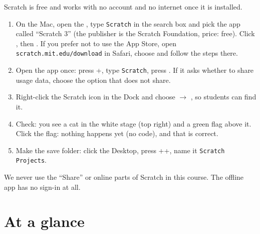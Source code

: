 \begin{teachernote}
Scratch is free and works with no account and no internet once it is installed.
\begin{enumerate}[leftmargin=1.4em,itemsep=1pt]
  \item On the Mac, open the , type \texttt{Scratch} in the search box and pick the app called \enquote{Scratch 3} (the publisher is the Scratch Foundation, price: free). Click , then . If you prefer not to use the App Store, open \texttt{scratch.mit.edu/download} in Safari, choose  and follow the steps there.
  \item Open the app once: press +, type \texttt{Scratch}, press . If it asks whether to share usage data, choose the option that does not share.
  \item Right-click the Scratch icon in the Dock and choose  $\rightarrow$ , so students can find it.
  \item Check: you see a cat in the white stage (top right) and a green flag above it. Click the flag: nothing happens yet (no code), and that is correct.
  \item Make the save folder: click the Desktop, press ++, name it \texttt{Scratch Projects}.
\end{enumerate}
We never use the \enquote{Share} or online parts of Scratch in this course. The offline app has no sign-in at all.
\end{teachernote}

\section{At a glance}
\begin{timeplan}
\end{timeplan}

